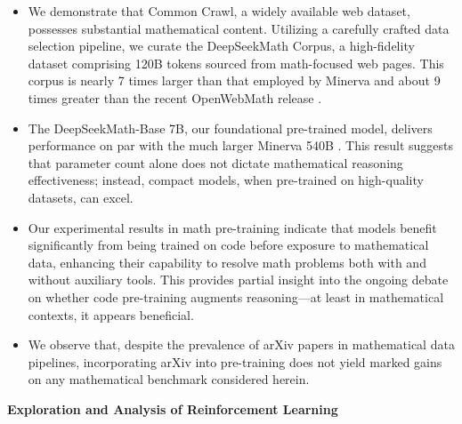 \begin{itemize}[topsep=0pt]
    \item We demonstrate that Common Crawl, a widely available web dataset, possesses substantial mathematical content. Utilizing a carefully crafted data selection pipeline, we curate the DeepSeekMath Corpus, a high-fidelity dataset comprising 120B tokens sourced from math-focused web pages. This corpus is nearly 7 times larger than that employed by Minerva \citep{minerva} and about 9 times greater than the recent OpenWebMath release \citep{openwebmath}.

    \item The DeepSeekMath-Base 7B, our foundational pre-trained model, delivers performance on par with the much larger Minerva 540B \citep{minerva}. This result suggests that parameter count alone does not dictate mathematical reasoning effectiveness; instead, compact models, when pre-trained on high-quality datasets, can excel.

    \item Our experimental results in math pre-training indicate that models benefit significantly from being trained on code before exposure to mathematical data, enhancing their capability to resolve math problems both with and without auxiliary tools. This provides partial insight into the ongoing debate on whether code pre-training augments reasoning—at least in mathematical contexts, it appears beneficial.

    \item We observe that, despite the prevalence of arXiv papers in mathematical data pipelines, incorporating arXiv into pre-training does not yield marked gains on any mathematical benchmark considered herein.
\end{itemize}

\textbf{Exploration and Analysis of Reinforcement Learning}

